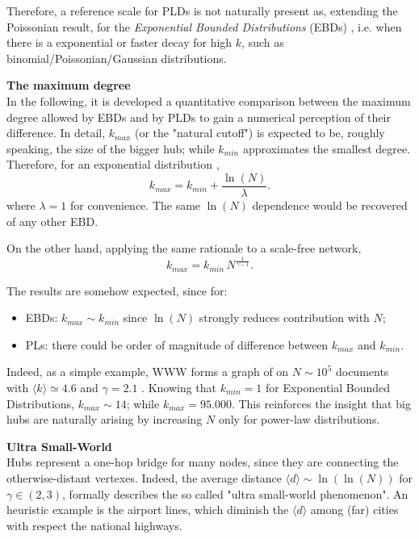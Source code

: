 \documentclass[a4paper,10pt, oneside]{book} %
\theoremstyle{definition}
\begin{document}
Therefore, a reference scale for PLDs is not naturally present as, extending the Poissonian result, for the \textit{Exponential Bounded Distributions} (EBDs) \cite{barabasi::2016networkbook}, i.e. when there is a exponential or faster decay for high $k$, such as binomial/Poissonian/Gaussian distributions.

{\large \textbf{The maximum degree}} \\
In the following, it is developed a quantitative comparison between the maximum degree allowed by EBDs and by PLDs to gain a numerical perception of their difference.
In detail, $k_{max}$ (or the "natural cutoff") is expected to be, roughly speaking, the size of the bigger hub; while $k_{min}$ approximates the smallest degree.
Therefore, for an exponential distribution \cite{barabasi::2016networkbook}, 
\begin{equation}
	k_{max} = k_{min} + \frac{\ln(N)}{\lambda}.
	\label{eq:Expkmax_up}	
\end{equation}
where $\lambda = 1$ for convenience. The same $\ln(N)$ dependence would be recovered of any other EBD.

On the other hand, applying the same rationale to a scale-free network, 
\begin{equation}
	k_{max} = k_{min}\,N^{\frac{1}{\gamma-1}}.
	\label{eq:SFkmax_up}
\end{equation}

The results are somehow expected, since for:
\begin{itemize}
	\item EBDs: $k_{max} \sim k_{min}$ since $\ln(N)$ strongly reduces contribution with $N$;
	\item PLs: there could be order of magnitude of difference between $k_{max}$ and $k_{min}$.
\end{itemize} 
Indeed, as a simple example, WWW forms a graph of on $N \sim 10^5$ documents with $\langle k \rangle \simeq 4.6$ and $\gamma = 2.1$ \cite{barabasi::2016networkbook}. 
Knowing that $k_{min} = 1$ for Exponential Bounded Distributions, $k_{max} \sim 14$; while $k_{max} = 95.000$. 
This reinforces the insight that big hubs are naturally arising by increasing $N$ only for power-law distributions.
\label{sec:SFProperties_up}

{\large \textbf{Ultra Small-World}} \\
Hubs represent a one-hop bridge for many nodes, since they are connecting the otherwise-distant vertexes. Indeed, the average distance $\langle d \rangle \sim \ln(\ln(N))$ for $\gamma \in (2,3)$, formally describes the so called "ultra small-world phenomenon". An heuristic example is the airport lines, which diminish the \(\langle d \rangle\) among (far) cities with respect the national highways.
\end{document}
